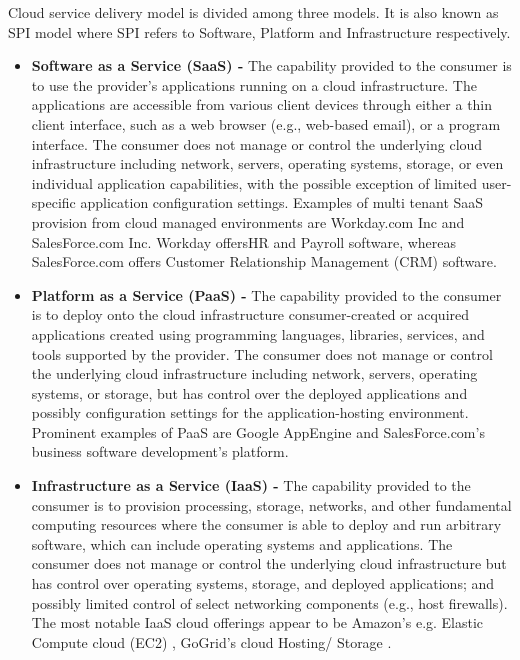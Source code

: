 \documentclass[a4paper,twoside,10pt]{report}
\begin{document}
Cloud service delivery model is divided among three models. It is also known as SPI model where SPI refers to Software, Platform and Infrastructure respectively. 

\begin{itemize}
\item \textbf{Software as a Service (SaaS) -} The capability provided to the consumer is to use the provider's applications running on a cloud infrastructure. The applications are accessible from various client devices through either a thin client interface, such as a web browser (e.g., web-based email), or a program interface. The consumer does not manage or control the underlying cloud infrastructure including network, servers, operating systems, storage, or even individual application capabilities, with the possible exception of limited user-specific application configuration settings. Examples of multi tenant SaaS provision from cloud managed environments are Workday.com Inc and SalesForce.com Inc. Workday offersHR and Payroll software, whereas SalesForce.com offers Customer Relationship Management (CRM) software.

\item \textbf{Platform as a Service (PaaS) -} The capability provided to the consumer is to deploy onto the cloud infrastructure consumer-created or acquired applications created using programming languages, libraries, services, and tools supported by the provider. The consumer does not manage or control the underlying cloud infrastructure including network, servers, operating systems, or storage, but has control over the deployed applications and possibly configuration settings for the application-hosting environment. Prominent examples of PaaS are Google AppEngine \cite{googleapp} and SalesForce.com's business software development's platform.

\item \textbf{Infrastructure as a Service (IaaS) -} The capability provided to the consumer is to provision processing, storage, networks, and other fundamental computing resources where the consumer is able to deploy and run arbitrary software, which can include operating systems and applications. The consumer does not manage or control the underlying cloud infrastructure but has control over operating systems, storage, and deployed applications; and possibly limited control of select networking components (e.g., host firewalls). The most notable IaaS cloud offerings appear to be Amazon's e.g. Elastic Compute cloud (EC2) \cite{amazonec2}, GoGrid's cloud Hosting/ Storage \cite{gogrid}. 

\end{itemize}
\end{document}
